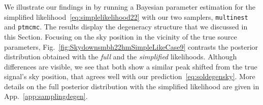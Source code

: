 \documentclass[aps,showpacs,twocolumn,prd,superscriptaddress,nofootinbib]{revtex4-1}
\newcommand{\be}{\begin{equation}}
\newcommand{\ee}{\end{equation}}
\newcommand\calL{{\mathcal{L}}}
\newcommand\betaL{{\beta_{L}}}
\newcommand\lambdaL{{\lambda_{L}}}
\newcommand\varphiL{{\varphi_{L}}}
\newcommand\psiL{{\psi_{L}}}
\newcommand{\SM}[1]{{\color{Blue} [SM: #1]}}
\begin{document}
We illustrate our findings in  by running a Bayesian parameter estimation for the simplified likelihood~\eqref{eq:simplelikelihood22} with our two samplers, \texttt{multinest} and \texttt{ptmcmc}. The results display the degeneracy structure that we discussed in this Section. Focusing on the sky position in the vicinity of the true source parameters, Fig.~\ref{fig:Skydownsmbh22hmSimpleLikeCase9} contrasts the posterior distribution obtained with the \textit{full} and the \textit{simplified} likelihoods. Although differences are visible, we see that both show a similar peak shifted from the true signal's sky position, that agrees well with our prediction~\eqref{eq:soldegensky}. More details on the full posterior distribution with the simplified likelihood are given in App.~\ref{app:samplingdegen}.

%
\end{document}
